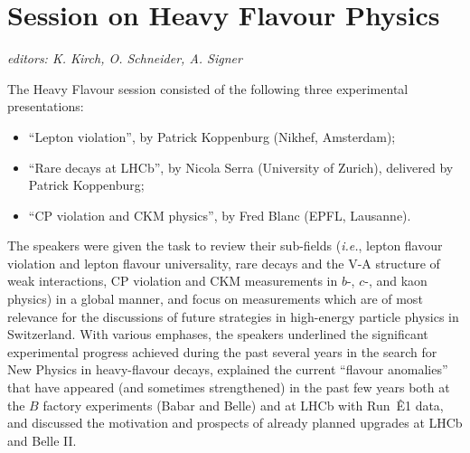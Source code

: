 \section{Session on Heavy Flavour Physics}\label{flavour}{\it editors: K. Kirch, O. Schneider, A. Signer}

The Heavy Flavour session consisted of the following three experimental presentations:
\begin{itemize} \setlength{\itemsep}{-1ex}
\item ``Lepton violation'', by Patrick Koppenburg (Nikhef, Amsterdam);
\item ``Rare decays at LHCb'', by Nicola Serra (University of Zurich), delivered by Patrick Koppenburg;
\item ``CP violation and CKM physics'', by Fred Blanc (EPFL, Lausanne).
\end{itemize}

\noindent The speakers were given the task to review their sub-fields ({\it i.e.},  lepton flavour violation and lepton flavour 
universality, rare decays and the V-A structure of weak interactions, CP violation and CKM measurements in $b$-, $c$-,
and kaon physics) in a global manner, and focus on measurements which are of most relevance for the discussions of
future strategies in high-energy particle physics in Switzerland. With various emphases, the speakers underlined the
significant experimental progress achieved during the past several years in the search for New Physics in heavy-flavour
decays, explained the current ``flavour anomalies'' that have appeared (and sometimes strengthened) in the past few 
years both at the $B$ factory experiments (Babar and Belle) and at LHCb with Run~Ê1 data, and discussed the motivation 
and prospects of already planned upgrades at LHCb  and Belle II.

\medskip

